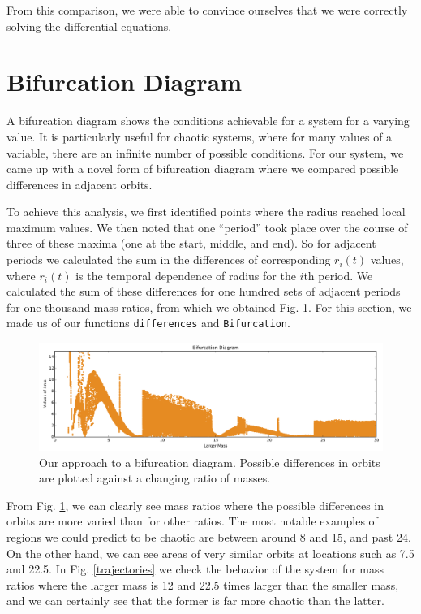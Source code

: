\documentclass{article}
\begin{document}
From this comparison, we were able to convince ourselves that we were correctly solving the differential equations.

\section*{Bifurcation Diagram}

A bifurcation diagram shows the conditions achievable for a system for a varying value.  It is particularly useful for chaotic systems, where for many values of a variable, there are an infinite number of possible conditions.  For our system, we came up with a novel form of bifurcation diagram where we compared possible differences in adjacent orbits.

To achieve this analysis, we first identified points where the radius reached local maximum values.  We then noted that one ``period'' took place over the course of three of these maxima (one at the start, middle, and end).  So for adjacent periods we calculated the sum in the differences of corresponding $r_{i}(t)$ values, where $r_{i}(t)$ is the temporal dependence of radius for the $i$th period.  We calculated the sum of these differences for one hundred sets of adjacent periods for one thousand mass ratios, from which we obtained Fig. \ref{bifurcation}.  For this section, we made us of our functions \texttt{differences} and \texttt{Bifurcation}.

\begin{figure}[h]
\centering
\includegraphics[width=\textwidth]{bifurcation}
\caption{Our approach to a bifurcation diagram.  Possible differences in orbits are plotted against a changing ratio of masses.}
\label{bifurcation}
\end{figure}

From Fig. \ref{bifurcation}, we can clearly see mass ratios where the possible differences in orbits are more varied than for other ratios.  The most notable examples of regions we could predict to be chaotic are between around 8 and 15, and past 24.  On the other hand, we can see areas of very similar orbits at locations such as 7.5 and 22.5.  In Fig. \ref{trajectories} we check the behavior of the system for mass ratios where the larger mass is 12 and 22.5 times larger than the smaller mass, and we can certainly see that the former is far more chaotic than the latter.
\end{document}
